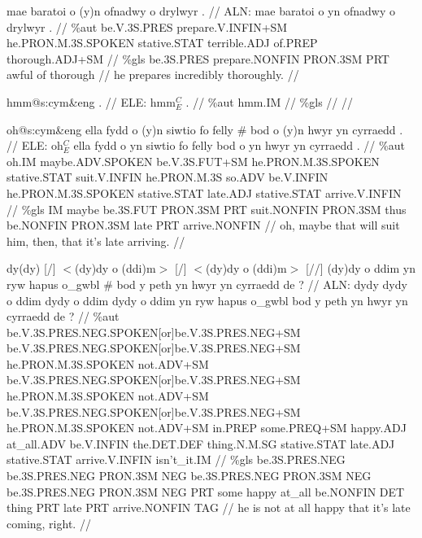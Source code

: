 \documentclass[a4paper,10pt]{article}
\begin{document}
\ex
\begingl[lingstyle=gergl]
\glchat mae baratoi o (y)n ofnadwy o drylwyr . //
\glsurface ALN:  mae baratoi o yn ofnadwy o drylwyr .  //
\glauto \%aut  be{\scriptsize .V.3S.PRES} prepare{\scriptsize .V.INFIN+SM} he{\scriptsize .PRON.M.3S.SPOKEN} stative{\scriptsize .STAT} terrible{\scriptsize .ADJ} of{\scriptsize .PREP} thorough{\scriptsize .ADJ+SM}   //
\glmanual \%gls  be{\scriptsize .3S.PRES} prepare{\scriptsize .NONFIN} PRON{\scriptsize .3SM} PRT awful of thorough   //
\gleng he prepares incredibly thoroughly. //
\endgl
\xe

\ex
\begingl[lingstyle=gergl]
\glchat hmm@s:cym\&eng . //
\glsurface ELE:  hmm$^{C}_{E}$ .  //
\glauto \%aut  hmm{\scriptsize .IM}   //
\glmanual \%gls     //
\gleng  //
\endgl
\xe

\ex
\begingl[lingstyle=gergl]
\glchat oh@s:cym\&eng ella fydd o (y)n siwtio fo felly \# bod o (y)n hwyr yn cyrraedd . //
\glsurface ELE:  oh$^{C}_{E}$ ella fydd o yn siwtio fo felly bod o yn hwyr yn cyrraedd .  //
\glauto \%aut  oh{\scriptsize .IM} maybe{\scriptsize .ADV.SPOKEN} be{\scriptsize .V.3S.FUT+SM} he{\scriptsize .PRON.M.3S.SPOKEN} stative{\scriptsize .STAT} suit{\scriptsize .V.INFIN} he{\scriptsize .PRON.M.3S} so{\scriptsize .ADV} be{\scriptsize .V.INFIN} he{\scriptsize .PRON.M.3S.SPOKEN} stative{\scriptsize .STAT} late{\scriptsize .ADJ} stative{\scriptsize .STAT} arrive{\scriptsize .V.INFIN}   //
\glmanual \%gls  IM maybe be{\scriptsize .3S.FUT} PRON{\scriptsize .3SM} PRT suit{\scriptsize .NONFIN} PRON{\scriptsize .3SM} thus be{\scriptsize .NONFIN} PRON{\scriptsize .3SM} late PRT arrive{\scriptsize .NONFIN}    //
\gleng oh, maybe that will suit him, then, that it's late arriving. //
\endgl
\xe

\ex
\begingl[lingstyle=gergl]
\glchat dy(dy) [/] $<$(dy)dy o (ddi)m$>$ [/] $<$(dy)dy o (ddi)m$>$ [//] (dy)dy o ddim yn ryw hapus o\_gwbl \# bod y peth yn hwyr yn cyrraedd de ? //
\glsurface ALN:  dydy dydy o ddim dydy o ddim dydy o ddim yn ryw hapus o\_gwbl bod y peth yn hwyr yn cyrraedd de ?  //
\glauto \%aut  be{\scriptsize .V.3S.PRES.NEG.SPOKEN[or]be.V.3S.PRES.NEG+SM} be{\scriptsize .V.3S.PRES.NEG.SPOKEN[or]be.V.3S.PRES.NEG+SM} he{\scriptsize .PRON.M.3S.SPOKEN} not{\scriptsize .ADV+SM} be{\scriptsize .V.3S.PRES.NEG.SPOKEN[or]be.V.3S.PRES.NEG+SM} he{\scriptsize .PRON.M.3S.SPOKEN} not{\scriptsize .ADV+SM} be{\scriptsize .V.3S.PRES.NEG.SPOKEN[or]be.V.3S.PRES.NEG+SM} he{\scriptsize .PRON.M.3S.SPOKEN} not{\scriptsize .ADV+SM} in{\scriptsize .PREP} some{\scriptsize .PREQ+SM} happy{\scriptsize .ADJ} at\_all{\scriptsize .ADV} be{\scriptsize .V.INFIN} the{\scriptsize .DET.DEF} thing{\scriptsize .N.M.SG} stative{\scriptsize .STAT} late{\scriptsize .ADJ} stative{\scriptsize .STAT} arrive{\scriptsize .V.INFIN} isn't\_it{\scriptsize .IM}   //
\glmanual \%gls  be{\scriptsize .3S.PRES.NEG} be{\scriptsize .3S.PRES.NEG} PRON{\scriptsize .3SM} NEG be{\scriptsize .3S.PRES.NEG} PRON{\scriptsize .3SM} NEG be{\scriptsize .3S.PRES.NEG} PRON{\scriptsize .3SM} NEG PRT some happy at\_all be{\scriptsize .NONFIN} DET thing PRT late PRT arrive{\scriptsize .NONFIN} TAG   //
\gleng he is not at all happy that it's late coming, right. //
\endgl
\xe
\end{document}
